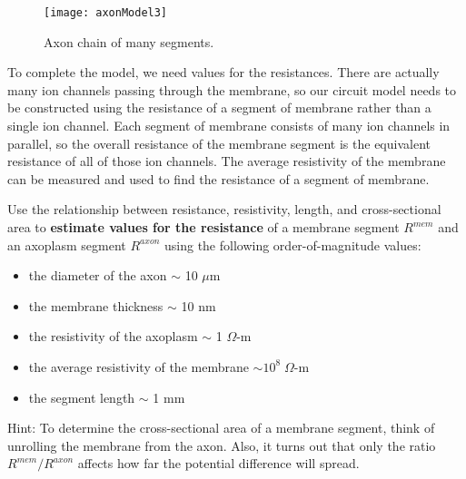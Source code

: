 \begin{wrapfigure}{R}{0.45\textwidth}
  \vspace{-15pt}  
  \begin{center}
    \texttt{[image: axonModel3]}
  \end{center}
  \caption{Axon chain of many segments.}
  \label{fig:axMod3}
  \vspace{-5pt}
\end{wrapfigure}

To complete the model, we need values for the resistances.
There are actually many ion channels passing through the membrane, so our circuit model needs to be constructed using the resistance of a segment of membrane rather  than a single ion channel.
Each segment of membrane consists of many ion channels in parallel, so the overall resistance of the membrane segment is the equivalent resistance of all of those ion channels. 
The average resistivity of the membrane can be measured and used to find the resistance of a segment of membrane.
\par 
Use the relationship between resistance, resistivity, length, and cross-sectional area to \textbf{estimate values for the resistance} of a membrane segment $R^{mem}$ and an axoplasm segment $R^{axon}$ using the following order-of-magnitude values:
\begin{itemize}
\itemsep-0.2em
\item the diameter of the axon $\sim$ 10 $\mu$m
\item the membrane thickness $\sim$ 10 nm
\item the resistivity of the axoplasm $\sim$ 1 $\Omega$-m
\item the average resistivity of the membrane $\sim  10^{8} \; \Omega$-m
\item the segment length $\sim$ 1 mm
\end{itemize}
Hint: To determine the cross-sectional area of a membrane segment, think of unrolling the membrane from the axon.
Also, it turns out that only the ratio $R^{mem}/R^{axon}$ affects how far the potential difference will spread.

